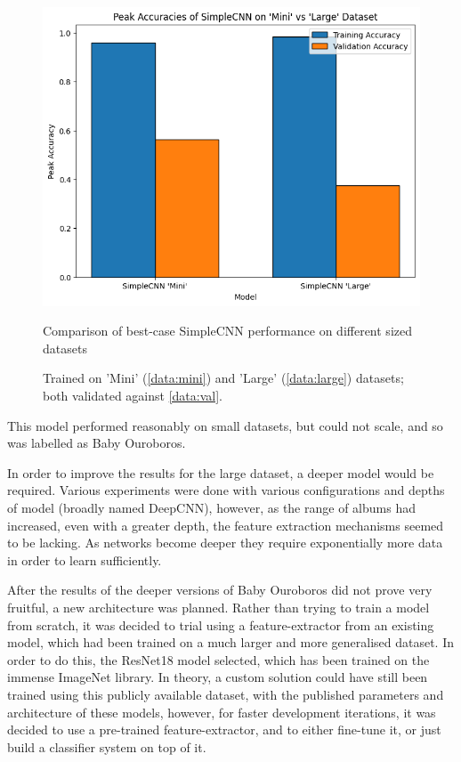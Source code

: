                 \begin{figure}[h]
                    \centering
                    \includegraphics[width=\textwidth]{images/SimpleCNNs_PeakAccuracy.png}
                    \caption{Comparison of best-case SimpleCNN performance on different sized datasets}
                    \label{fig:SimpleCNNs_PeakAccuracy-Mini_Train}
                    \caption*{Trained on 'Mini' (\ref{data:mini}) and 'Large' (\ref{data:large}) datasets; both validated against \ref{data:val}.}
                \end{figure}
    
                This model performed reasonably on small datasets, but could not scale, and so was labelled as Baby Ouroboros.
    
                In order to improve the results for the large dataset, a deeper model would be required. Various experiments were done with various configurations and depths of model (broadly named DeepCNN), however, as the range of albums had increased, even with a greater depth, the feature extraction mechanisms seemed to be lacking. As networks become deeper they require exponentially more data in order to learn sufficiently.
    
                After the results of the deeper versions of Baby Ouroboros did not prove very fruitful, a new architecture was planned. Rather than trying to train a model from scratch, it was decided to trial using a feature-extractor from an existing model, which had been trained on a much larger and more generalised dataset. In order to do this, the ResNet18 model selected, which has been trained on the immense ImageNet library. In theory, a custom solution could have still been trained using this publicly available dataset, with the published parameters and architecture of these models, however, for faster development iterations, it was decided to use a pre-trained feature-extractor, and to either fine-tune it, or just build a classifier system on top of it.
    

